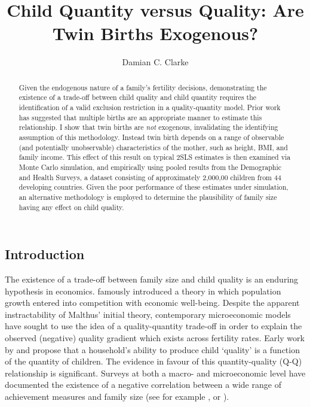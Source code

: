 \documentclass{article}[11pt,subeqn]
\title{Child Quantity versus Quality: Are Twin Births Exogenous?}
\author{Damian C. Clarke}
\begin{document}
\linenumbers
\begin{spacing}{1.25}

\maketitle
\begin{abstract}
Given the endogenous nature of a family's fertility decisions, demonstrating the existence of a trade-off between child quality and child quantity requires the identification of a valid exclusion restriction in a quality-quantity model.  Prior work has suggested that multiple births are an appropriate manner to estimate this relationship.  I show that twin births are \emph{not} exogenous, invalidating the identifying assumption of this methodology.  Instead twin birth depends on a range of observable (and potentially unobservable) characteristics of the mother, such as height, BMI, and family income.  This effect of this result on typical 2SLS estimates is then examined via Monte Carlo simulation, and empirically using pooled results from the Demographic and Health Surveys, a dataset consisting of approximately 2,000,00 children from 44 developing countries.  Given the poor performance of these estimates under simulation, an alternative methodology is employed to determine the plausibility of family size having any effect on child quality.
\end{abstract}

\section{Introduction}
The existence of a trade-off between family size and child quality is an enduring hypothesis in economics.  \citet{Malthus1798} famously introduced a theory in which population growth entered into competition with economic   
well-being.  Despite the apparent instractability of Malthus' initial theory, contemporary microeconomic models have sought to use the idea of a quality-quantity trade-off in order to explain the observed (negative) quality gradient which exists across fertility rates.  Early work by \citet{BeckerLewis1973} and \citet{BeckerTomes1976} propose that a household's ability to produce child `quality' is a function of the quantity of children.  The evidence in favour of this quantity-quality (Q-Q) relationship is significant.  Surveys at both a macro- and microeconomic level have documented the existence of a negative correlation between a wide range of achievement measures and family size (see for example \cite{Desai1995}, or \cite{Hanushek1992}).


\end{spacing}
\end{document}

